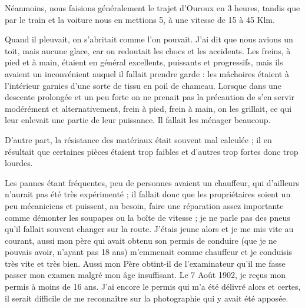 \documentclass[11pt,a4paper]{report}
\begin{document}
Néanmoins, nous faisions généralement le trajet d'Ouroux en 3 heures, tandis que par le train et la voiture nous en mettions 5, à une vitesse de 15 à 45 Klm.

Quand il pleuvait, on s'abritait comme l'on pouvait. J'ai dit que nous avions un toit, mais aucune glace, car on redoutait les chocs et les accidents. Les freins, à pied et à main, étaient en général excellents, puissants et progressifs, mais ils avaient un inconvénient auquel il fallait prendre garde : les mâchoires étaient à l'intérieur garnies d'une sorte de tissu en poil de chameau. Lorsque dans une descente prolongée et un peu forte on ne prenait pas la précaution de s'en servir modérément et alternativement, frein à pied, frein à main, on les grillait, ce qui leur enlevait une partie de leur puissance. Il fallait les ménager beaucoup.

D'autre part, la résistance des matériaux était souvent mal calculée ; il en résultait que certaines pièces étaient trop faibles et d'autres trop fortes donc trop lourdes.

Les pannes étant fréquentes, peu de personnes avaient un chauffeur, qui d'ailleurs n'aurait pas été très expérimenté ; il fallait donc que les propriétaires soient un peu mécaniciens et puissent, au besoin, faire une réparation assez importante comme démonter les soupapes ou la boîte de vitesse ; je ne parle pas des pneus qu'il fallait souvent changer sur la route. J'étais jeune alors et je me mis vite au courant, aussi mon père qui avait obtenu son permis de conduire (que je ne pouvais avoir, n'ayant pas 18 ans) m'emmenait comme chauffeur et je conduisis très vite et très bien. Aussi mon Père obtint-il de l'examinateur qu'il me fasse passer mon examen malgré mon âge insuffisant. Le 7 Août 1902, je reçus mon permis à moins de 16 ans. J'ai encore le permis qui m'a été délivré alors et certes, il serait difficile de me reconnaître sur la photographie qui y avait été apposée.
\end{document}
